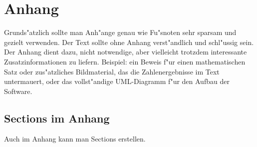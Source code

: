 \appendix
\chapter{Anhang}
\label{cap:Anhang}

Grunds"atzlich sollte man Anh"ange genau wie Fu"snoten sehr sparsam und gezielt verwenden.
Der Text sollte ohne Anhang verst"andlich und schl"ussig sein.
Der Anhang dient dazu, nicht notwendige, aber vielleicht trotzdem interessante Zusatzinformationen zu liefern.
Beispiel: ein Beweis f"ur einen mathematischen Satz oder zus"atzliches Bildmaterial, das die Zahlenergebnisse im Text untermauert, oder das vollst"andige UML-Diagramm f"ur den Aufbau der Software.


\section{Sections im Anhang}

Auch im Anhang kann man Sections erstellen.
